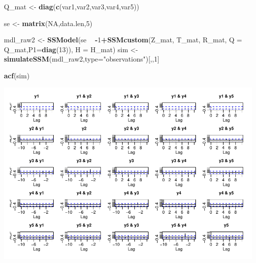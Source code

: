 \documentclass[]{article}
\newenvironment{Shaded}{\begin{snugshade}}{\end{snugshade}}
\newcommand{\KeywordTok}[1]{\textcolor[rgb]{0.13,0.29,0.53}{\textbf{#1}}}
\newcommand{\DataTypeTok}[1]{\textcolor[rgb]{0.13,0.29,0.53}{#1}}
\newcommand{\DecValTok}[1]{\textcolor[rgb]{0.00,0.00,0.81}{#1}}
\newcommand{\StringTok}[1]{\textcolor[rgb]{0.31,0.60,0.02}{#1}}
\newcommand{\OtherTok}[1]{\textcolor[rgb]{0.56,0.35,0.01}{#1}}
\newcommand{\OperatorTok}[1]{\textcolor[rgb]{0.81,0.36,0.00}{\textbf{#1}}}
\newcommand{\NormalTok}[1]{#1}
\begin{document}
\begin{Shaded}
\begin{Highlighting}[]
\NormalTok{Q_mat <-}\StringTok{ }\KeywordTok{diag}\NormalTok{(}\KeywordTok{c}\NormalTok{(var1,var2,var3,var4,var5))}

\NormalTok{se <-}\StringTok{ }\KeywordTok{matrix}\NormalTok{(}\OtherTok{NA}\NormalTok{,data.len,}\DecValTok{5}\NormalTok{)}

\NormalTok{mdl_raw2 <-}\StringTok{ }\KeywordTok{SSModel}\NormalTok{(se }\OperatorTok{~}\StringTok{ }\OperatorTok{-}\DecValTok{1}\OperatorTok{+}\KeywordTok{SSMcustom}\NormalTok{(Z_mat, T_mat, R_mat, }\DataTypeTok{Q =}\NormalTok{ Q_mat,}\DataTypeTok{P1=}\KeywordTok{diag}\NormalTok{(}\DecValTok{13}\NormalTok{)), }\DataTypeTok{H =}\NormalTok{ H_mat)}
\NormalTok{sim <-}\StringTok{  }\KeywordTok{simulateSSM}\NormalTok{(mdl_raw2,}\DataTypeTok{type=}\StringTok{"observations"}\NormalTok{)[,,}\DecValTok{1}\NormalTok{]}

\KeywordTok{acf}\NormalTok{(sim)}
\end{Highlighting}
\end{Shaded}

\includegraphics{simulation_test_files/figure-latex/simulate_sae-1.pdf}
\end{document}
